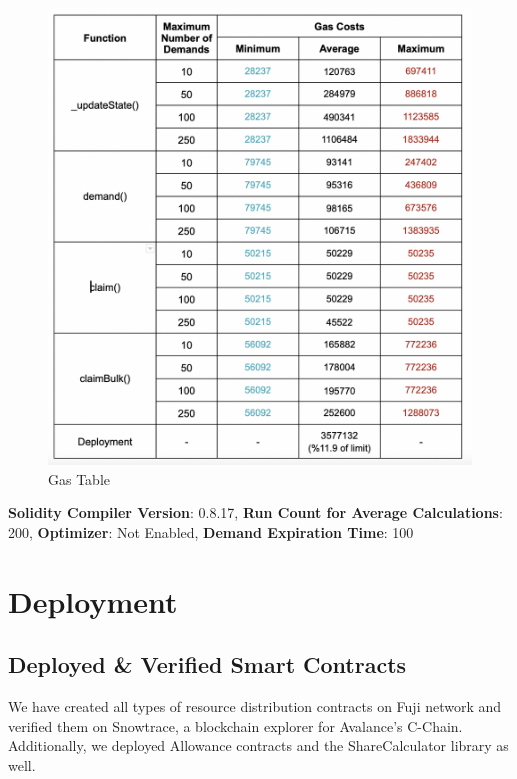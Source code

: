 \documentclass[a4paper,12pt]{report}
\begin{document}
\begin{figure}[H]
	\centering
	\includegraphics[width=1\textwidth]{gas_table.png}
	\caption{Gas Table}
\end{figure}

\textbf{Solidity Compiler Version}: 0.8.17,
\textbf{Run Count for Average Calculations}: 200,
\textbf{Optimizer}: Not Enabled,
\textbf{Demand Expiration Time}: 100

\section{Deployment}
\subsection{Deployed \& Verified Smart Contracts}
We have created all types of resource distribution contracts on Fuji network and verified them on Snowtrace, a blockchain explorer for Avalance’s C-Chain. Additionally, we deployed Allowance contracts and the ShareCalculator library as well.
\end{document}

